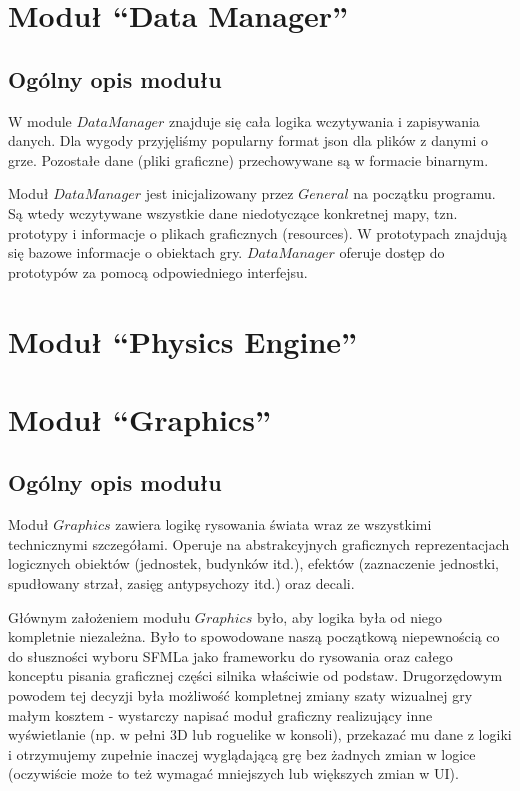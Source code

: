 \documentclass[licencjacka]{pracamgr}
\begin{document}
  \section{Moduł ``Data Manager''}
    \subsection{Ogólny opis modułu}
      W module $DataManager$ znajduje się cała logika wczytywania i zapisywania danych. Dla wygody przyjęliśmy
      popularny format json dla plików z danymi o grze. Pozostałe dane (pliki graficzne) przechowywane są w formacie
      binarnym.

      Moduł $DataManager$ jest inicjalizowany przez $General$ na początku programu. Są wtedy wczytywane wszystkie dane
      niedotyczące konkretnej mapy, tzn. prototypy i informacje o plikach graficznych (resources). W prototypach
      znajdują się bazowe informacje o obiektach gry. $DataManager$ oferuje dostęp do prototypów za pomocą
      odpowiedniego interfejsu.

  \section{Moduł ``Physics Engine''}
  \section{Moduł ``Graphics''}
    \subsection{Ogólny opis modułu}
      Moduł $Graphics$ zawiera logikę rysowania świata wraz ze wszystkimi technicznymi szczegółami. Operuje na
      abstrakcyjnych graficznych reprezentacjach logicznych obiektów (jednostek, budynków itd.), efektów (zaznaczenie
      jednostki, spudłowany strzał, zasięg antypsychozy itd.) oraz decali.

      Głównym założeniem modułu $Graphics$ było, aby logika była od niego kompletnie niezależna. Było to spowodowane
      naszą początkową niepewnością co do słuszności wyboru SFMLa jako frameworku do rysowania oraz całego konceptu
      pisania graficznej części silnika właściwie od podstaw. Drugorzędowym powodem tej decyzji była możliwość
      kompletnej zmiany szaty wizualnej gry małym kosztem - wystarczy napisać moduł graficzny realizujący inne
      wyświetlanie (np. w pełni 3D lub roguelike w konsoli), przekazać mu dane z logiki i otrzymujemy zupełnie inaczej
      wyglądającą grę bez żadnych zmian w logice (oczywiście może to też wymagać mniejszych lub większych zmian w UI).
\end{document}
